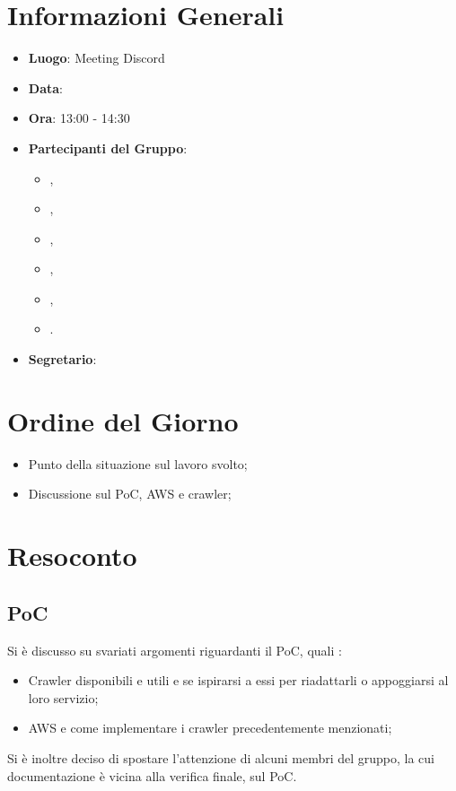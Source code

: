 \section{Informazioni Generali}

\begin{itemize}
\item{\textbf{Luogo}}: Meeting Discord
\item{\textbf{Data}}: \D{}
\item{\textbf{Ora}}: 13:00 - 14:30
\item{\textbf{Partecipanti del Gruppo}}: 
	\begin{itemize}
	\item{\EP{},} 
	\item{\FP{},}
	\item{\GC{},}
	\item{\MB{},}
	\item{\MG{},}
	\item{\PV{}.}
	\end{itemize} 
\item{\textbf{Segretario}}: \PV{}	
\end{itemize}

\section{Ordine del Giorno}
\begin{itemize}
\item{Punto della situazione sul lavoro svolto;}
\item{Discussione sul PoC, AWS e crawler;}


\end{itemize}

\section{Resoconto}

\subsection{PoC}
Si è discusso su svariati argomenti riguardanti il PoC, quali :  
\begin{itemize}
    \item Crawler disponibili e utili e se ispirarsi a essi per riadattarli o appoggiarsi al loro servizio;
    \item AWS e come implementare i crawler precedentemente menzionati;
\end{itemize}
Si è inoltre deciso di spostare l'attenzione di alcuni membri del gruppo, la cui documentazione è vicina alla verifica finale, sul PoC.

